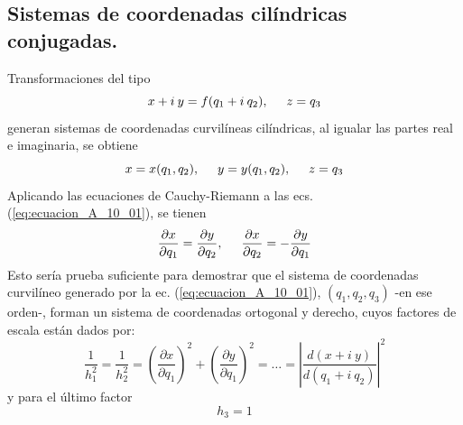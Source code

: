 \subsection{Sistemas de coordenadas cilíndricas conjugadas.}
Transformaciones del tipo
\begin{equation}
    x + i \: y = f (q_{1} + i \: q_{2}), \hspace{0.5cm} z = q_{3}
    \label{eq:ecuacion_A_10_01}
\end{equation}
generan sistemas de coordenadas curvilíneas cilíndricas, al igualar las partes real e imaginaria, se obtiene
\begin{equation*}
    x = x(q_{1}, q_{2}), \hspace{0.5cm} y = y(q_{1}, q_{2}), \hspace{0.5cm} z = q_{3}
\end{equation*}
Aplicando las ecuaciones de Cauchy-Riemann a las ecs. (\ref{eq:ecuacion_A_10_01}), se tienen
\begin{equation}
    \dfrac{\partial x}{\partial q_{1}} = \dfrac{\partial y}{\partial q_{2}}, \hspace{0.5cm} \dfrac{\partial x}{\partial q_{2}} = - \dfrac{\partial y}{\partial q_{1}}
    \label{eq:ecuacion_A_10_02}
\end{equation}
Esto sería prueba suficiente para demostrar que el sistema de coordenadas curvilíneo generado por la ec. (\ref{eq:ecuacion_A_10_01}), $(q_{1}, q_{2}, q_{3})$ -en ese orden-, forman un sistema de coordenadas ortogonal y derecho, cuyos factores de escala están dados por:
\begin{equation}
    \dfrac{1}{h_{1}^{2}} = \dfrac{1}{h_{2}^{2}} = \left( \dfrac{\partial x}{\partial q_{1}} \right)^{2} + \left( \dfrac{\partial y}{\partial q_{1}} \right)^{2} =  \ldots = \left| \dfrac{d (x + i \: y)}{d (q_{1} + i \: q_{2})} \right|^{2}
    \label{eq:ecuacion_A_10_03}  
\end{equation}
y para el último factor
\begin{equation}
    h_{3} = 1
    \label{eq:ecuacion_A_10_4}
\end{equation}
